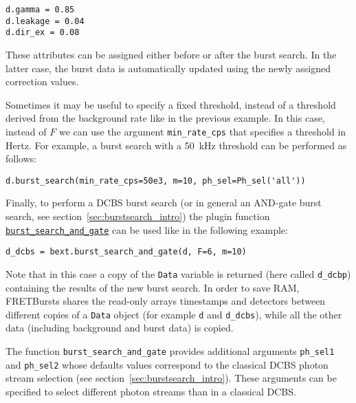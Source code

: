 \begin{verbatim}
d.gamma = 0.85
d.leakage = 0.04
d.dir_ex = 0.08
\end{verbatim}

These attributes can be assigned either before or after the burst search. In the
latter case, the burst data is
automatically updated using the newly assigned correction values.

Sometimes it may be useful to specify a fixed threshold, instead 
of a threshold derived from the background rate like in the previous example. In
this case, instead of $F$ we can use the argument \verb|min_rate_cps| that
specifies a threshold in Hertz. For example, a burst search with a 50~kHz
threshold can be performed as follows:

\begin{verbatim}
d.burst_search(min_rate_cps=50e3, m=10, ph_sel=Ph_sel('all'))
\end{verbatim}

Finally, to perform a DCBS burst search (or in general an AND-gate burst search,
see section~\ref{sec:burstsearch_intro}) the plugin function 
\href{http://fretbursts.readthedocs.org/en/latest/plugins.html#fretbursts.burstlib\_ext.burst\_search\_and\_gate}{\texttt{burst\_search\_and\_gate}}
can be used like in the following example:

\begin{verbatim}
d_dcbs = bext.burst_search_and_gate(d, F=6, m=10)
\end{verbatim}

Note that in this case a copy of the \verb|Data| variable is returned (here called \verb|d_dcbp|)
containing the results of the new burst search. In order to
save RAM, FRETBursts shares the read-only arrays timestamps and detectors between
different copies of a \verb|Data| object (for example \verb|d| and
\verb|d_dcbs|), while all the other data (including background and burst data)
is copied. 

The function \verb|burst_search_and_gate| provides additional arguments
\verb|ph_sel1| and \verb|ph_sel2| whose defaults values correspond to the 
classical DCBS photon stream selection (see section~\ref{sec:burstsearch_intro}).
These arguments can be specified to select different photon streams than in 
a classical DCBS.
